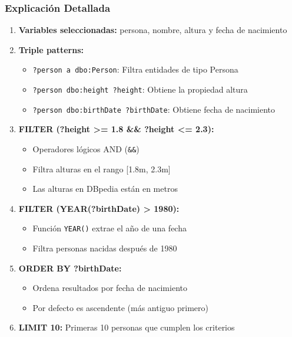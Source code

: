 \documentclass[12pt,a4paper]{article}
\begin{document}
\subsubsection{Explicación Detallada}

\begin{enumerate}
    \item \textbf{Variables seleccionadas:} persona, nombre, altura y fecha de nacimiento
    
    \item \textbf{Triple patterns:}
    \begin{itemize}
        \item \texttt{?person a dbo:Person}: Filtra entidades de tipo Persona
        \item \texttt{?person dbo:height ?height}: Obtiene la propiedad altura
        \item \texttt{?person dbo:birthDate ?birthDate}: Obtiene fecha de nacimiento
    \end{itemize}
    
    \item \textbf{FILTER (?height >= 1.8 \&\& ?height <= 2.3):} 
    \begin{itemize}
        \item Operadores lógicos AND (\texttt{\&\&})
        \item Filtra alturas en el rango [1.8m, 2.3m]
        \item Las alturas en DBpedia están en metros
    \end{itemize}
    
    \item \textbf{FILTER (YEAR(?birthDate) > 1980):}
    \begin{itemize}
        \item Función \texttt{YEAR()} extrae el año de una fecha
        \item Filtra personas nacidas después de 1980
    \end{itemize}
    
    \item \textbf{ORDER BY ?birthDate:} 
    \begin{itemize}
        \item Ordena resultados por fecha de nacimiento
        \item Por defecto es ascendente (más antiguo primero)
    \end{itemize}
    
    \item \textbf{LIMIT 10:} Primeras 10 personas que cumplen los criterios
\end{enumerate}
\end{document}
